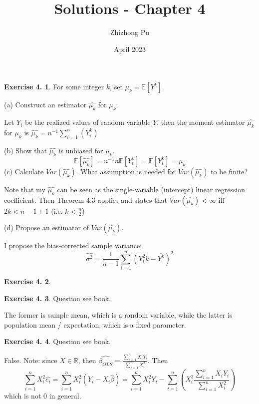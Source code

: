 \documentclass[12pt,letterpaper,reqno]{amsart}
\newcommand{\E}{\mathbb E}
\newcommand{\R}{\mathbb R}
\theoremstyle{plain}
\theoremstyle{definition}
\theoremstyle{definition}
\newtheorem{Exercise}{Exercise 4.}
\numberwithin{equation}{section}
\begin{document}
\author{Zhizhong Pu}
\title{Solutions - Chapter 4}
\date{April 2023}
\maketitle

\thispagestyle{empty}

\begin{Exercise} For some integer $k$, set $\mu_k=\E[Y^k]$.

    (a) Construct an estimator $\hat{\mu_k}$ for $\mu_k$.

    Let $Y_i$ be the realized values of random variable $Y$, then the moment estimator $\hat{\mu_k}$ for $\mu_k$ is $\hat{\mu_k} = n^{-1}\sum_{i=1}^n(Y_i^k)$

    (b) Show that $\hat{\mu_k}$ is unbiased for $\mu_k$.
    \[
    \E[\hat{\mu_k}] = n^{-1}n\E[Y_i^k] = \E[Y_i^k] = \mu_k
    \]
    (c) Calculate $Var(\hat{\mu_k})$. What assumption is needed for $Var(\hat{\mu_k})$ to be finite?
    
    Note that my $\hat{\mu_k}$ can be seen as the single-variable (intercept) linear regression coefficient. Then Theorem 4.3 applies and states that $Var(\hat{\mu_k})<\infty$ iff $2k<n-1+1$ (i.e. $k < \frac{n}{2}$) 

    (d) Propose an estimator of $Var(\hat{\mu_k})$.
    
    I propose the bias-corrected sample variance:
    \[
    \widehat{\sigma^2} = \frac{1}{n-1}\sum_{i=1}^n(Y_i^2k-\overline{Y^k})^2
    \]
    
\end{Exercise}

\begin{Exercise}

\end{Exercise}

\begin{Exercise} Question see book.

    The former is sample mean, which is a random variable, while the latter is population mean / expectation, which is a fixed parameter. 
\end{Exercise}

\begin{Exercise} Question see book.

    False. Note: since $X\in \R$, then $\hat{\beta_{OLS} } = \frac{\sum_{i=1}^n X_iY_i}{\sum_{i=1}^n X_i^2} $. Then
    \[
    \sum_{i=1}^n X_i^2\widehat{e_i} = \sum_{i=1}^n X_i^2(Y_i-X_i\hat{\beta}) = \sum_{i=1}^n X_i^2Y_i - \sum_{i=1}^n (X_i^3 \frac{\sum_{i=1}^n X_iY_i}{\sum_{i=1}^n X_i^2} )
    \]
    which is not $0$ in general.
\end{Exercise}
\end{document}
